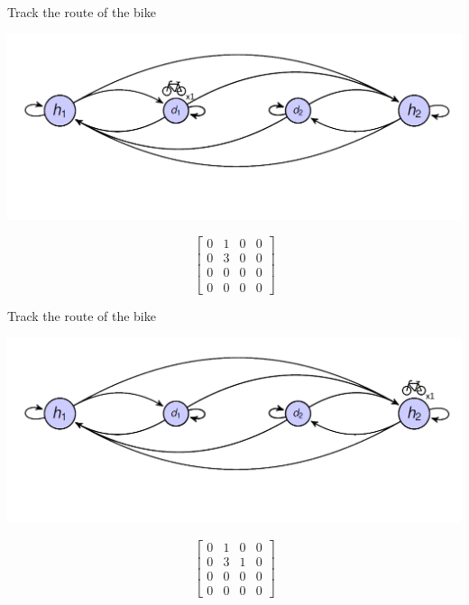 \begin{frame}{Track the route of the bike}
	
	\begin{center}
		
		\includegraphics[width=\linewidth]{graphics/createmarkov_firststep}
		
		
		$$
		\begin{bmatrix}
		0 & 1 & 0 & 0\\
		0 & 3 & 0 & 0\\
		0 & 0 & 0 & 0\\
		0 & 0 & 0 & 0
		\end{bmatrix}
		$$
	\end{center}
	
\end{frame}

\begin{frame}{Track the route of the bike}
	
	\begin{center}
		
		\includegraphics[width=\linewidth]{graphics/createmarkov_laststep}
		
		
		$$
		\begin{bmatrix}
		0 & 1 & 0 & 0\\
		0 & 3 & 1 & 0\\
		0 & 0 & 0 & 0\\
		0 & 0 & 0 & 0
		\end{bmatrix}
		$$
	\end{center}
	
\end{frame}

